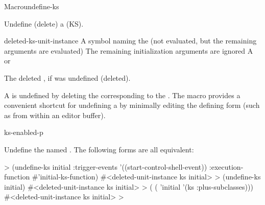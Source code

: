 \documentclass[10pt,twoside,english,pdftex]{article}
\begin{document}
\begin{functiondoc}{Macro}{undefine-ks}{
      
    \returns{} }
%
%
%

\fnsyntax

\fnpurpose Undefine (delete) a  (KS).

\fnpackage {}

\fnmodule {}

\fnargs
\begin{args}{deleted-ks-unit-instance}
\arg[ks-name] A symbol naming the  (not evaluated, but the remaining
arguments are evaluated)
 The remaining initialization arguments are ignored
 A   or \nil{}
\end{args}

\fnreturns The deleted  , if
  was undefined (deleted).

\fndescription A  is undefined by deleting the 
corresponding to the .  The  macro
provides a convenient shortcut for undefining a  by minimally
editing the defining form (such as from within an editor buffer).

\begin{alsos}{ks-enabled-p}
\also[define-ks]
\also[ks-enabled-p]
\end{alsos}

\fnexamples Undefine the  named . The following
forms are all equivalent:
%
\W\supp
\begin{example}
  > (undefine-ks initial
       :trigger-events '((start-control-shell-event)) 
       :execution-function #'initial-ks-function)
  #<deleted-unit-instance ks initial>\goodpagebreak
  > (undefine-ks initial)
  #<deleted-unit-instance ks initial>\goodpagebreak
  > ( 
       ( 'initial '(ks :plus-subclasses)))
  #<deleted-unit-instance ks initial>
  >
\end{example}

\end{functiondoc}

\end{document}
